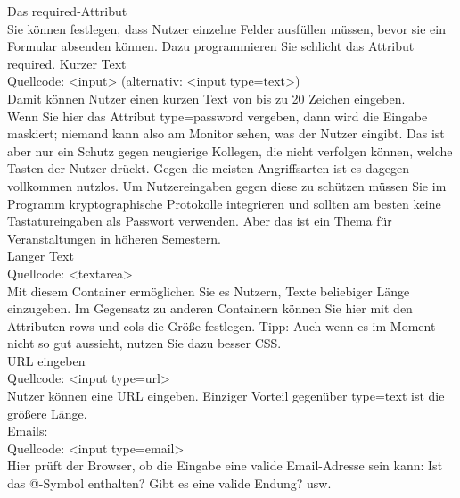 Das required-Attribut\\

Sie können festlegen, dass Nutzer einzelne Felder ausfüllen müssen, bevor sie ein Formular absenden können. Dazu programmieren Sie schlicht das Attribut required.
Kurzer Text\\

Quellcode: <input> (alternativ: <input type=text>)\\

Damit können Nutzer einen kurzen Text von bis zu 20 Zeichen eingeben.\\

Wenn Sie hier das Attribut type=password vergeben, dann wird die Eingabe maskiert; niemand kann also am Monitor sehen, was der Nutzer eingibt. Das ist aber nur ein Schutz gegen neugierige Kollegen, die nicht verfolgen können, welche Tasten der Nutzer drückt. Gegen die meisten Angriffsarten ist es dagegen vollkommen nutzlos. Um Nutzereingaben gegen diese zu schützen müssen Sie im Programm kryptographische Protokolle integrieren und sollten am besten keine Tastatureingaben als Passwort verwenden. Aber das ist ein Thema für Veranstaltungen in höheren Semestern.\\

Langer Text\\

Quellcode: <textarea>\\

Mit diesem Container ermöglichen Sie es Nutzern, Texte beliebiger Länge einzugeben. Im Gegensatz zu anderen Containern können Sie hier mit den Attributen rows und cols die Größe festlegen. Tipp: Auch wenn es im Moment nicht so gut aussieht, nutzen Sie dazu besser CSS.\\

URL eingeben\\

Quellcode: <input type=url>\\

Nutzer können eine URL eingeben. Einziger Vorteil gegenüber type=text ist die größere Länge.\\

Emails:\\

Quellcode: <input type=email>\\

Hier prüft der Browser, ob die Eingabe eine valide Email-Adresse sein kann: Ist das @-Symbol enthalten? Gibt es eine valide Endung? usw.\\

